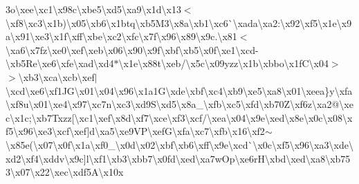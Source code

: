 \begin{DoxyCompactItemize}
3o\textbackslash{}xee\textbackslash{}xc1\textbackslash{}x98c\textbackslash{}xbe5\textbackslash{}xd5\textbackslash{}xa9\textbackslash{}x1d\textbackslash{}x13$<$\textbackslash{}xf8\textbackslash{}xc3\textbackslash{}x1b)\textbackslash{}x05\textbackslash{}xb6\textbackslash{}x1btq\textbackslash{}xb5\+M3\textbackslash{}x8a\textbackslash{}xb1\textbackslash{}xc6\`{}\textbackslash{}xada\textbackslash{}xa2\+:\textbackslash{}x92\textbackslash{}xf5\textbackslash{}x1e\textbackslash{}x9a\textbackslash{}x91\textbackslash{}xe3\textbackslash{}x1f\textbackslash{}xff\textbackslash{}xbe\textbackslash{}xc2\textbackslash{}xfc\textbackslash{}x7f\textbackslash{}x96\textbackslash{}x89\textbackslash{}x9c.\textbackslash{}x81$<$\textbackslash{}xa6\textbackslash{}x7fz\textbackslash{}xe0\textbackslash{}xef\textbackslash{}xeb\textbackslash{}x06\textbackslash{}x90\textbackslash{}x9f\textbackslash{}xbf\textbackslash{}xb5\textbackslash{}x0f\textbackslash{}xe1\textbackslash{}xcd-\/\textbackslash{}xb5\+Re\textbackslash{}xe6\textbackslash{}xfe\textbackslash{}xad\textbackslash{}xd4$\ast$\textbackslash{}x1e\textbackslash{}x88t\textbackslash{}xeb/\textbackslash{}x5c\textbackslash{}x09yzz\textbackslash{}x1b\textbackslash{}xbbo\textbackslash{}x1f\+C\textbackslash{}x04$>$$>$\textbackslash{}xb3\textbackslash{}xca\textbackslash{}xcb\textbackslash{}xef$\vert$\textbackslash{}xcd\textbackslash{}xe6\textbackslash{}xf1\+J\+G\textbackslash{}x01\textbackslash{}x04\textbackslash{}x96\textbackslash{}x1a1\+G\textbackslash{}xde\textbackslash{}xbf\textbackslash{}xc4\textbackslash{}xb9\textbackslash{}xe5\textbackslash{}xa8\textbackslash{}x01\textbackslash{}xeea\}y\textbackslash{}xfa\textbackslash{}xf8u\textbackslash{}x01\textbackslash{}xe4\textbackslash{}x97\textbackslash{}xc7n\textbackslash{}xc3\textbackslash{}xd9\+S\textbackslash{}xd5\textbackslash{}x8a\+\_\+\textbackslash{}xfb\textbackslash{}xc5\textbackslash{}xfd\textbackslash{}xb70\+Z\textbackslash{}xf6z\textbackslash{}xa2@\textbackslash{}xec\textbackslash{}x1c;\textbackslash{}xb7\+Txzz\mbox{[}\textbackslash{}xc1\textbackslash{}xef\textbackslash{}x8d\textbackslash{}xf7\textbackslash{}xce\textbackslash{}xf3\textbackslash{}xcf/\textbackslash{}xea\textbackslash{}x04\textbackslash{}x9e\textbackslash{}xed\textbackslash{}x8e\textbackslash{}x0c\textbackslash{}x08\textbackslash{}xf5\textbackslash{}x96\textbackslash{}xe3\textbackslash{}xcf\textbackslash{}xef\mbox{]}d\textbackslash{}xa5\textbackslash{}xe9\+V\+P\textbackslash{}xef\+G\textbackslash{}xfa\textbackslash{}xc7\textbackslash{}xfb\textbackslash{}x16\textbackslash{}xf2$\sim$\textbackslash{}x85e(\textbackslash{}x07\textbackslash{}x0f\textbackslash{}x1a\textbackslash{}xf0\+\_\+\textbackslash{}x0d\textbackslash{}x02\textbackslash{}xbf\textbackslash{}xb6\textbackslash{}xff\textbackslash{}x9e\textbackslash{}xcd\`{}\textbackslash{}x0c\textbackslash{}xf5\textbackslash{}x96\textbackslash{}xa3\textbackslash{}xde\textbackslash{}xd2\textbackslash{}xf4\textbackslash{}xddv\textbackslash{}x9c\mbox{]}l\textbackslash{}xf1\textbackslash{}xb3\textbackslash{}xbb7\textbackslash{}x0fd\textbackslash{}xed\textbackslash{}xa7w\+Op\textbackslash{}xe6r\+H\textbackslash{}xbd\textbackslash{}xed\textbackslash{}xa8\textbackslash{}xb753\textbackslash{}x07\textbackslash{}x22\textbackslash{}xec\textbackslash{}xdf5\+A\textbackslash{}x10x\
\end{DoxyCompactItemize}
